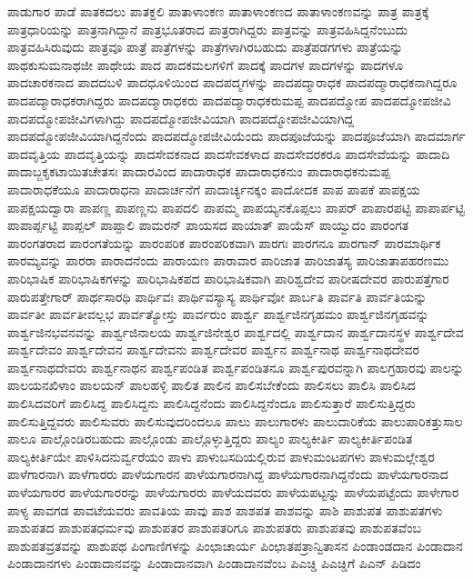 {ಪಾಡುಗಾರ
ಪಾಡೆ
ಪಾತಕದಲು
ಪಾತಕ್ದಲಿ
ಪಾತಾಳಾಂಕಣ
ಪಾತಾಳಾಂಕಣದ
ಪಾತಾಳಾಂಕಣವನ್ನು
ಪಾತ್ರ
ಪಾತ್ರಕ್ಕೆ
ಪಾತ್ರಧಾರಿಯನ್ನು
ಪಾತ್ರನಾಗಿದ್ದಾನೆ
ಪಾತ್ರಭೂತರಾದ
ಪಾತ್ರರಾಗಿದ್ದರು
ಪಾತ್ರವನ್ನು
ಪಾತ್ರವಹಿಸಿದ್ದನೆಂಬುದು
ಪಾತ್ರವಹಿಸಿರುವುದು
ಪಾತ್ರವೂ
ಪಾತ್ರೆ
ಪಾತ್ರೆಗಳನ್ನು
ಪಾತ್ರೆಗಳಾಗಿರಬಹುದು
ಪಾತ್ರೆಪಡಗಗಳು
ಪಾತ್ರೆಯನ್ನು
ಪಾಥಕುಸುಮನಾಥಜೀ
ಪಾಥೇಯ
ಪಾದ
ಪಾದಕಮಲಗಳಿಗೆ
ಪಾದಕ್ಕೆ
ಪಾದಗಳ
ಪಾದಗಳನ್ನು
ಪಾದಗಳೂ
ಪಾದಚಾರಕನಾದ
ಪಾದದಬಳಿ
ಪಾದಧೂಳಿಯಿಂದ
ಪಾದಪದ್ಮಗಳನ್ನು
ಪಾದಪದ್ಮಾರಾಧಕ
ಪಾದಪದ್ಮಾರಾಧಕನಾಗಿದ್ದರೂ
ಪಾದಪದ್ಮಾರಾಧಕರಾಗಿದ್ದರು
ಪಾದಪದ್ಮಾರಾಧಕರು
ಪಾದಪದ್ಮಾರಾಧಕರುಮಪ್ಪ
ಪಾದಪದ್ಮೋಪ
ಪಾದಪದ್ಮೋಪಜೀವಿ
ಪಾದಪದ್ಮೋಪಜೀವಿಗಳಾಗಿದ್ದು
ಪಾದಪದ್ಮೋಪಜೀವಿಯಾಗಿ
ಪಾದಪದ್ಮೋಪಜೀವಿಯಾಗಿದ್ದ
ಪಾದಪದ್ಮೋಪಜೀವಿಯಾಗಿದ್ದನೆಂದು
ಪಾದಪದ್ಮೋಪಜೀವಿಯೆಂದು
ಪಾದಪೂಜೆಯನ್ನು
ಪಾದಪೂಜೆಯಾಗಿ
ಪಾದಮಾರ್ಗ
ಪಾದವೃತ್ತಿಯ
ಪಾದವೃತ್ತಿಯನ್ನು
ಪಾದಸೇವಕನಾದ
ಪಾದಸೇವಕಳಾದ
ಪಾದಸೇವರಕರೂ
ಪಾದಸೇವೆಯನ್ನು
ಪಾದಾದಿ
ಪಾದಾಬ್ಜಕೃಕಟಾಯಿತಚೇತಸಃ
ಪಾದಾರವಿಂದ
ಪಾದಾರಾಧಕ
ಪಾದಾರಾಧಕನುಂ
ಪಾದಾರಾಧಕನುಮಪ್ಪ
ಪಾದಾರಾಧಕೆಯೂ
ಪಾದಾರಾಧನಾ
ಪಾದಾರ್ಚನೆಗೆ
ಪಾದಾರ್ಚ್ಯನಕ್ಕಂ
ಪಾದೋದಕ
ಪಾಪ
ಪಾಪಕೆ
ಪಾಪಕ್ಷಯ
ಪಾಪಕ್ಷಯದ್ವಾರಾ
ಪಾಪಣ್ಣ
ಪಾಪಣ್ಣನು
ಪಾಪದಲಿ
ಪಾಪಮ್ಮ
ಪಾಪಯ್ಯನಕೊಪ್ಪಲು
ಪಾಪರ್
ಪಾಪಾರಪಟ್ಟಿ
ಪಾಪಾರ್ಪಟ್ಟಿ
ಪಾಪಾರ್ಪ್ಪಟ್ಟಿ
ಪಾಪ್ಪಲ್
ಪಾಪ್ಪಾಲಿ
ಪಾಮರನ್
ಪಾಯಸದ
ಪಾಯಾತ್
ಪಾಯೆಸ್
ಪಾಯ್ವುದಂ
ಪಾರಂಗತ
ಪಾರಂಗತರಾದ
ಪಾರಂಗತೆಯನ್ನು
ಪಾರಂಪರಿಕ
ಪಾರಂಪರಿಕವಾಗಿ
ಪಾರಗಃ
ಪಾರಗನೂ
ಪಾರಗಾನ್
ಪಾರಮಾರ್ಥಿಕ
ಪಾರಮ್ಯವನ್ನು
ಪಾರರಾ
ಪಾರಾದನೆಂದು
ಪಾರಾಯಣ
ಪಾರಾವಾರ
ಪಾರಿಜಾತ
ಪಾರಿಜಾತಸ್ಯ
ಪಾರಿಜಾತಾಪಹರಣಮು
ಪಾರಿಭಾಷಿಕ
ಪಾರಿಭಾಷಿಕಗಳನ್ನು
ಪಾರಿಭಾಷಿಕಪದ
ಪಾರಿಭಾಷಿಕವಾಗಿ
ಪಾರಿಶ್ವದೇವ
ಪಾರೀಷದೇವರ
ಪಾರುಪತ್ತೆಗಾರ
ಪಾರುಪತ್ತೇಗಾರ್
ಪಾರ್ಥಸಾರಥಿ
ಪಾರ್ಥಿವಃ
ಪಾರ್ಥಿವಸ್ಯಾಸ್ಯ
ಪಾರ್ಥಿವೋ
ಪಾರ್ಬತಿ
ಪಾರ್ವತಿ
ಪಾರ್ವತಿಯನ್ನು
ಪಾರ್ವತೀ
ಪಾರ್ವತೀವಲ್ಲಭ
ಪಾರ್ವತ್ಯೋಸ್ತು
ಪಾರ್ವರುಂ
ಪಾರ್ಶ್ವ
ಪಾರ್ಶ್ವಜಿನಗೃಹಮಂ
ಪಾರ್ಶ್ವಜಿನಗೃಹವನ್ನು
ಪಾರ್ಶ್ವಜಿನಭವನವನ್ನು
ಪಾರ್ಶ್ವಜಿನಾಲಯ
ಪಾರ್ಶ್ವಜಿನೇಶ್ವರ
ಪಾರ್ಶ್ವದಲ್ಲಿ
ಪಾರ್ಶ್ವದಾನ
ಪಾರ್ಶ್ವದಾನಸ್ಥಳ
ಪಾರ್ಶ್ವದೇವ
ಪಾರ್ಶ್ವದೇವಂ
ಪಾರ್ಶ್ವದೇವನ
ಪಾರ್ಶ್ವದೇವನು
ಪಾರ್ಶ್ವದೇವರ
ಪಾರ್ಶ್ವನ
ಪಾರ್ಶ್ವನಾಥ
ಪಾರ್ಶ್ವನಾಥದೇವರ
ಪಾರ್ಶ್ವನಾಥದೇವರು
ಪಾರ್ಶ್ವನಾಥನ
ಪಾರ್ಶ್ವಪಂಡಿತ
ಪಾರ್ಶ್ವಪಂಡಿತನೂ
ಪಾರ್ಶ್ವಪುರವನ್ನಾಗಿ
ಪಾಲಗ್ರಹಾರವು
ಪಾಲನ್ನು
ಪಾಲಯನಖಿಳಾಂ
ಪಾಲಯನ್
ಪಾಲಹಳ್ಳಿ
ಪಾಲಿತ
ಪಾಲಿನ
ಪಾಲಿಸಬೇಕೆಂದು
ಪಾಲಿಸಲು
ಪಾಲಿಸಿ
ಪಾಲಿಸಿದ
ಪಾಲಿಸಿದವರಿಗೆ
ಪಾಲಿಸಿದ್ದ
ಪಾಲಿಸಿದ್ದನು
ಪಾಲಿಸಿದ್ದನೆಂದು
ಪಾಲಿಸಿದ್ದನೆಂದೂ
ಪಾಲಿಸುತ್ತಾರೆ
ಪಾಲಿಸುತ್ತಿದ್ದರು
ಪಾಲಿಸುತ್ತಿದ್ದವರು
ಪಾಲಿಸುವರು
ಪಾಲಿಸುವುದರಿಂದಲೂ
ಪಾಲು
ಪಾಲುಗಾರಳು
ಪಾಲುದಾರಿಕೆಯ
ಪಾಲುಪಾರಿಕತ್ತುಸಾಲ
ಪಾಲೂ
ಪಾಲ್ಗೊಂಡಿರಬಹುದು
ಪಾಲ್ಗೊಂಡು
ಪಾಲ್ಗೊಳ್ಳುತ್ತಿದ್ದರು
ಪಾಲ್ಯಂ
ಪಾಲ್ಯಕೀರ್ತಿ
ಪಾಲ್ಯಕೀರ್ತಿಪಂಡಿತ
ಪಾಲ್ಯಕೀರ್ತಿಯೇ
ಪಾಳಿಸಿದನುರ್ವ್ವರೆಯಂ
ಪಾಳು
ಪಾಳುಬಸದಿಯಲ್ಲಿರುವ
ಪಾಳುಮಂಟಪಗಳು
ಪಾಳುಮಲ್ಲೇಶ್ವರ
ಪಾಳೆಗಾರನಾಗಿ
ಪಾಳೆಗಾರರು
ಪಾಳೆಯಗಾರನ
ಪಾಳೆಯಗಾರನಾಗಿದ್ದ
ಪಾಳೆಯಗಾರನಾಗಿದ್ದನೆಂದು
ಪಾಳೆಯಗಾರನಾದ
ಪಾಳೆಯಗಾರರ
ಪಾಳೆಯಗಾರರನ್ನು
ಪಾಳೆಯಗಾರರು
ಪಾಳೆಯದವರು
ಪಾಳೆಯಪಟ್ಟನ್ನು
ಪಾಳೆಯಪಟ್ಟೆಂದು
ಪಾಳೇಗಾರ
ಪಾಳ್ಯ
ಪಾವಗಡ
ಪಾವಟೆಯವರು
ಪಾವತಿಯ
ಪಾವು
ಪಾಶ
ಪಾಶಪತ
ಪಾಶವನ್ನು
ಪಾಶಿ
ಪಾಶುಪತ
ಪಾಶುಪತಗಳು
ಪಾಶುಪತದ
ಪಾಶುಪತಧರ್ಮವು
ಪಾಶುಪತರ
ಪಾಶುಪತರಿಗೂ
ಪಾಶುಪತರು
ಪಾಶುಪತವು
ಪಾಶುಪತವೆಂಬ
ಪಾಶುಪತವ್ರತವನ್ನು
ಪಾಶುಪಥ
ಪಿಂಗಾಣಿಗಳನ್ನು
ಪಿಂಛಾಚಾರ್ಯ
ಪಿಂಛಾತಪತ್ರಾನ್ವಿತಾಸನ
ಪಿಂಡಾಂಡದಾನ
ಪಿಂಡಾದಾನ
ಪಿಂಡಾದಾನಗಳು
ಪಿಂಡಾದಾನವನ್ನು
ಪಿಂಡಾದಾನವಾಗಿ
ಪಿಂಡಾದಾನವೆಂಬ
ಪಿಎಚ್ಡಿ
ಪಿಎಚ್ಡಿಗೆ
ಪಿಎನ್
ಪಿಡಿದಂ
}
